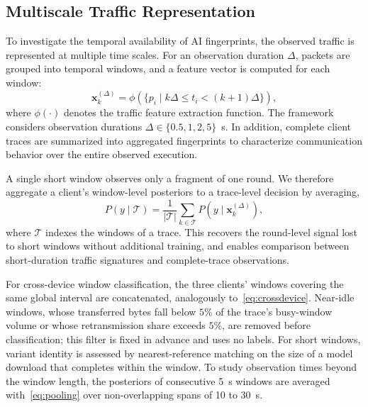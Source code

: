 \subsection{Multiscale Traffic Representation}
\label{subsec:multiscale}
To investigate the temporal availability of AI fingerprints, the observed
traffic is represented at multiple time scales. For an observation duration
$\Delta$, packets are grouped into temporal windows, and a feature vector is
computed for each window:
\begin{equation}
\mathbf{x}_{k}^{(\Delta)}
=
\phi\left(
\{p_i \mid k\Delta \leq t_i < (k+1)\Delta\}
\right),
\label{eq:window_features}
\end{equation}
where $\phi(\cdot)$ denotes the traffic feature extraction function. The
framework considers observation durations $\Delta \in \{0.5,1,2,5\}$~s. In
addition, complete client traces are summarized into aggregated fingerprints to
characterize communication behavior over the entire observed execution.

A single short window observes only a fragment of one round. We therefore
aggregate a client's window-level posteriors to a trace-level decision by
averaging,
\begin{equation}
P(y \mid \mathcal{T})
= \frac{1}{|\mathcal{T}|}\sum_{k \in \mathcal{T}}
P\!\left(y \mid \mathbf{x}_k^{(\Delta)}\right),
\label{eq:pooling}
\end{equation}
where $\mathcal{T}$ indexes the windows of a trace. This recovers the
round-level signal lost to short windows without additional training, and
enables comparison between short-duration traffic signatures and complete-trace
observations.

For cross-device window classification, the three clients' windows covering
the same global interval are concatenated, analogously to~\eqref{eq:crossdevice}.
Near-idle windows, whose transferred bytes fall below $5\%$ of the trace's
busy-window volume or whose retransmission share exceeds $5\%$, are removed
before classification; this filter is fixed in advance and uses no labels.
For short windows, variant identity is assessed by nearest-reference matching on
the size of a model download that completes within the window.
To study observation times beyond the window length, the posteriors of
consecutive 5~s windows are averaged with~\eqref{eq:pooling} over
non-overlapping spans of 10 to 30~s.

